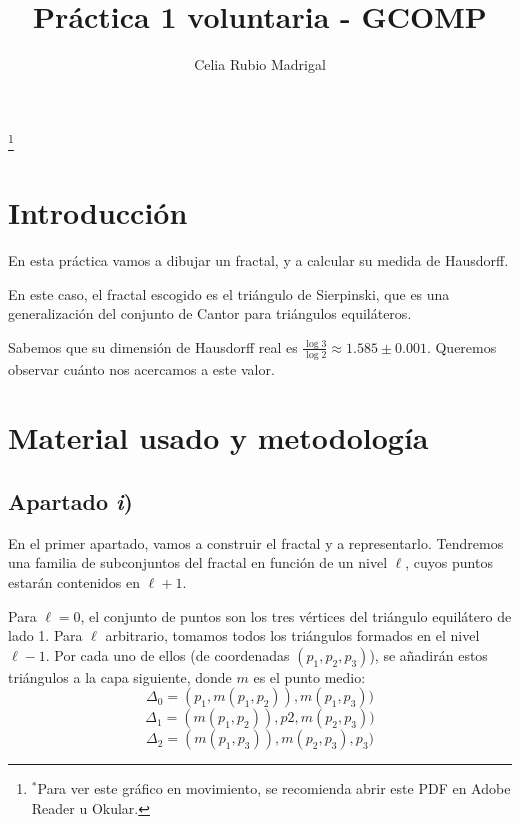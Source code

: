 \documentclass[a4paper]{article}
\author{Celia Rubio Madrigal}
\title{Práctica 1 voluntaria - GCOMP}
\begin{document}
	\maketitle
	
	\tableofcontents
	
	\vfill
	
	\begin{center}

\renewcommand{\thefootnote}{}\footnote{$^*$Para ver este gráfico en movimiento, se recomienda abrir este PDF en Adobe Reader u Okular.}
	\end{center}
	
	
	\vfill
	\newpage
	
	\section{Introducción}
	En esta práctica vamos a dibujar un fractal, y a calcular su medida de Hausdorff.
	
	En este caso, el fractal escogido es el triángulo de Sierpinski, que es una generalización del conjunto de Cantor para triángulos equiláteros.
	
	Sabemos que su dimensión de Hausdorff real es $\frac{\log 3}{\log 2} \approx 1.585 \pm 0.001 $. Queremos observar cuánto nos acercamos a este valor.
	
	\section{Material usado y metodología}
	
	
	\subsection{Apartado \textit{i})}
	En el primer apartado, vamos a construir el fractal y a representarlo. Tendremos una familia de subconjuntos del fractal en función de un nivel $\ell$, cuyos puntos estarán contenidos en $\ell+1$.
	
	Para $\ell=0$, el conjunto de puntos son los tres vértices del triángulo equilátero de lado 1. Para $\ell$ arbitrario, tomamos todos los triángulos formados en el nivel $\ell-1$. Por cada uno de ellos (de coordenadas $(p_1,p_2,p_3)$), se añadirán estos triángulos a la capa siguiente, donde $m$ es el punto medio:
	\[ \Delta_0 = (p_1 , m(p_1,p_2)), m(p_1,p_3)) \]
	\[ \Delta_1 = (m(p_1,p_2)), p2, m(p_2,p_3)) \]
	\[ \Delta_2 = (m(p_1,p_3)), m(p_2,p_3), p_3) \]
\end{document}
